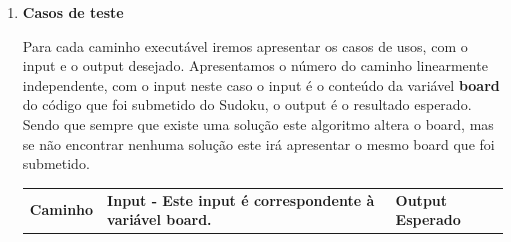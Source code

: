 \documentclass{article}
\begin{document}
\begin{itemize}
\begin{enumerate}
\begin{itemize}
  \end{itemize}
    \item \textbf{Casos de teste}\\
    \texttt{}\par Para cada caminho executável iremos apresentar os casos de usos, com o input e o output
desejado.
\quad Apresentamos o número do caminho linearmente independente, com o input neste caso o input é o conteúdo da variável \textbf{board} do código que foi submetido do Sudoku, o output é o resultado esperado. Sendo que sempre que existe uma solução este algoritmo altera o board, mas se não encontrar nenhuma solução este irá apresentar o mesmo board que foi submetido.
\begin{table}[H]
    \centering
    \begin{tabular}{|c|p{7cm}|p{3cm}|} %
    \hline
    \renewcommand{\arraystretch}{1.8}
    \textbf{Caminho} & \textbf{Input - Este input é correspondente à variável board.} & \textbf{Output Esperado} \\
                        

\end{tabular}
\end{table}
\end{enumerate}
\end{itemize}
\end{document}
